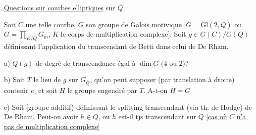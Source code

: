\uline{Questions sur courbes elliptiques} sur $\overline Q$.

Soit $C$ une telle courbe, $G$ son groupe de Galois motivique [$G=\mathrm{Gl}(2,Q)$ ou $G=\prod_{K/Q}G_m$, $K$ le corps de multiplication complexe]. Soit $g\in G(C)/G(Q)$ définissant l'application du  transcendant de Betti dans celui de De Rham.

a) $Q(g)$ de degré de transcendance égal à $\dim G$ ($4$ ou $2$)?

b) Soit $T$ le lieu de $g$ sur $G_{\overline Q}$,  qu'on peut supposer (par translation à droite) contenir $e$, et soit $H$ le groupe engendré  par $T$. 
A-t-on $H=G$

c) Soit   [groupe additif) définissant le splitting transcendant (via th. de Hodge) de De Rham. Peut-on avoir $h\in\overline Q$, ou $h$ est-il tjs transcendant sur $Q$ [\uline{cas où} $C$ \uline{n'a pas de multiplication complexe}]

